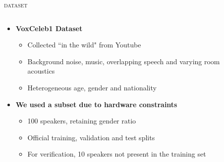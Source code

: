 \documentclass[10pt,aspectratio=1610,professionalfont]{beamer}
\begin{document}
\begin{frame}{\textsc{dataset}}
	 \begin{columns}
		\begin{column}{0.5\textwidth}
		 \begin{itemize}
	        \item \textbf{VoxCeleb1 Dataset}
	        \begin{itemize}
	            \item Collected “in the wild" from Youtube
	            \item Background noise, music, overlapping speech and varying room acoustics
	            \item Heterogeneous age, gender and nationality 
	        \end{itemize} 
	        \item \textbf{We used a subset due to hardware constraints}
	        \begin{itemize}
	            \item 100 speakers, retaining gender ratio
		      \item Official training, validation and test splits
		      \item For verification,	 10 speakers not present in the training set 
	        \end{itemize}
	    \end{itemize}
		\end{column}
		\begin{column}{0.5\textwidth} 
		\begin{center}
		     	\begin{table}[htbp]
			    \begin{center}
\end{center}
\end{table}
\end{center}
\end{column}
\end{columns}
\end{frame}
\end{document}

